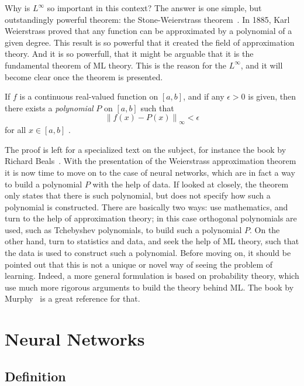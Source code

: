 Why is $L^{\infty}$ so important in this context? The answer is one simple, but outstandingly powerful theorem: the Stone-Weierstrass theorem~\cite{stoneApplicationsTheoryBoolean1937, stoneGeneralizedWeierstrassApproximation1948}. In 1885, Karl Weierstrass proved that any function can be approximated by a polynomial of a given degree. This result is so powerful that it created the field of approximation theory. And it is so powerfull, that it might be arguable that it is the fundamental theorem of ML theory. This is the reason for the $L^{\infty}$, and it will become clear once the theorem is presented.
\begin{theorem}
    If \(f\) is a continuous real-valued function on \([a, b]\), and if any \(\epsilon > 0\) is given, then there exists a \emph{polynomial} \(P\) on \([a, b]\) such that
    \[
        { \left\lVert f(x) - P(x) \right\rVert }_{\infty} < \epsilon
    \]
    for all \(x \in [a, b]\) .
\end{theorem}
The proof is left for a specialized text on the subject, for instance the book by Richard 
Beals~\cite{bealsAnalysisIntroduction2004}. With the presentation of the Weierstrass 
approximation theorem it is now time to move on to the case of neural networks, which are 
in fact a way to build a polynomial \(P\) with the help of data. If looked at closely, the 
theorem only states that there is such polynomial, but does not specify how such a 
polynomial is constructed. There are basically two ways: use mathematics, 
and turn to the help of approximation theory; in this case orthogonal polynomials are used,
such as Tchebyshev polynomials, to build such a polynomial $P$. On the other hand, turn to 
statistics and data, and seek the help of ML theory, such that the data is used to construct
such a polynomial. Before moving on, it should be pointed out that this is not a unique or 
novel way of seeing the problem of learning. Indeed, a more general formulation is based on 
probability theory, which use much more rigorous arguments to build the theory behind ML. 
The book by Murphy~\cite{murphyMachineLearningProbabilistic2012} is a great reference for 
that.

\section{Neural Networks}
\subsection{Definition}
